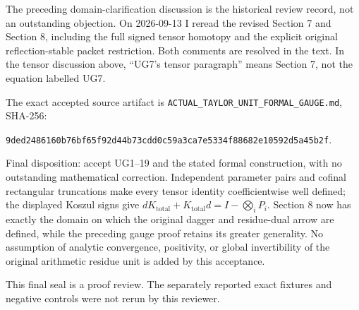 The preceding domain-clarification discussion is the historical review record, not an outstanding objection. On 2026-09-13 I reread the revised Section 7 and Section 8, including the full signed tensor homotopy and the explicit original reflection-stable packet restriction. Both comments are resolved in the text. In the tensor discussion above, ``UG7's tensor paragraph'' means Section 7, not the equation labelled UG7.

The exact accepted source artifact is \nolinkurl{ACTUAL_TAYLOR_UNIT_FORMAL_GAUGE.md}, SHA-256:

\nolinkurl{9ded2486160b76bf65f92d44b73cdd0c59a3ca7e5334f88682e10592d5a45b2f}.

Final disposition: accept UG1--19 and the stated formal construction, with no outstanding mathematical correction. Independent parameter pairs and cofinal rectangular truncations make every tensor identity coefficientwise well defined; the displayed Koszul signs give \(dK_{\mathrm{total}}+K_{\mathrm{total}}d=I-\bigotimes_i P_i\). Section 8 now has exactly the domain on which the original dagger and residue-dual arrow are defined, while the preceding gauge proof retains its greater generality. No assumption of analytic convergence, positivity, or global invertibility of the original arithmetic residue unit is added by this acceptance.

This final seal is a proof review. The separately reported exact fixtures and negative controls were not rerun by this reviewer.

\endgroup


\endgroup
